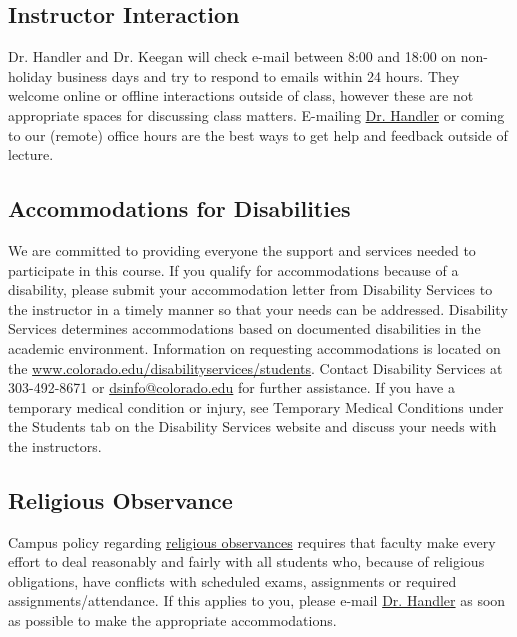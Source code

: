 \documentclass[10pt]{memoir}
\makeatletter
\def\instructorAemail{abe.handler@colorado.edu}
\makeatother
\begin{document}

\subsection{Instructor Interaction}
Dr. Handler and Dr. Keegan will check e-mail between 8:00 and 18:00 on non-holiday business days and try to respond to emails within 24 hours. They welcome online or offline interactions outside of class, however these are not appropriate spaces for discussing class matters. E-mailing \href{\instructorAemail}{Dr. Handler} or coming to our (remote) office hours are the best ways to get help and feedback outside of lecture.

\subsection{Accommodations for Disabilities}
We are committed to providing everyone the support and services needed to participate in this course. If you qualify for accommodations because of a disability, please submit your accommodation letter from Disability Services to the instructor in a timely manner so that your needs can be addressed. Disability Services determines accommodations based on documented disabilities in the academic environment. Information on requesting accommodations is located on the \href{Disability Services website}{www.colorado.edu/disabilityservices/students}. Contact Disability Services at 303-492-8671 or \href{mailto:dsinfo@colorado.edu}{dsinfo@colorado.edu} for further assistance. If you have a temporary medical condition or injury, see Temporary Medical Conditions under the Students tab on the Disability Services website and discuss your needs with the instructors.

\subsection{Religious Observance}
Campus policy regarding \href{http://www.colorado.edu/policies/observance-religious-holidays-and-absences-classes-andor-exams}{religious observances} requires that faculty make every effort to deal reasonably and fairly with all students who, because of religious obligations, have conflicts with scheduled exams, assignments or required assignments/attendance. If this applies to you, please e-mail \href{\instructorAemail}{Dr. Handler} as soon as possible to make the appropriate accommodations.
\end{document}
